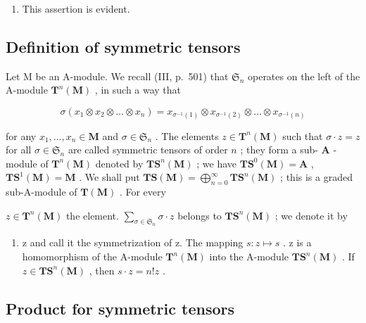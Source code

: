 \begin{enumerate}
\def\labelenumi{(\roman{enumi})}
\setcounter{enumi}{2}
\tightlist
\item
  This assertion is evident.
\end{enumerate}

\subsection{Definition of symmetric tensors}

Let M be an A-module. We recall (III, p.~501) that \(\mathfrak{S}_n\) operates on the left of the A-module \(\mathbf{T}^n (\mathbf{M})\) , in such a way that

\[
\sigma \left(x _ {1} \otimes x _ {2} \otimes \dots \otimes x _ {n}\right) = x _ {\sigma^ {- 1} (1)} \otimes x _ {\sigma^ {- 1} (2)} \otimes \dots \otimes x _ {\sigma^ {- 1} (n)}
\]

for any \(x_{1},\ldots,x_{n}\in\mathbf{M}\) and \(\sigma\in\mathfrak{S}_{n}\) . The elements \(z\in\mathbf{T}^{n}(\mathbf{M})\) such that \(\sigma\cdot z=z\) for all \(\sigma\in\mathfrak{S}_{n}\) are called symmetric tensors of order \(n\) ; they form a sub- \(\mathbf{A}\) -module of \(\mathbf{T}^{n}(\mathbf{M})\) denoted by \(\mathbf{T}\mathbf{S}^{n}(\mathbf{M})\) ; we have \(\mathbf{T}\mathbf{S}^{0}(\mathbf{M})=\mathbf{A}\) , \(\mathbf{T}\mathbf{S}^{1}(\mathbf{M})=\mathbf{M}\) . We shall put \(\mathbf{T}\mathbf{S}(\mathbf{M}) = \bigoplus_{n=0}^{\infty} \mathbf{T}\mathbf{S}^{n}(\mathbf{M})\) ; this is a graded sub-A-module of \(\mathbf{T}(\mathbf{M})\) . For every

\(z \in \mathbf{T}^n(\mathbf{M})\) the element. \(\sum_{\sigma \in \mathfrak{S}_n} \sigma \cdot z\) belongs to \(\mathbf{T}\mathbf{S}^n(\mathbf{M})\) ; we denote it by

\begin{enumerate}
\def\labelenumi{\alph{enumi}.}
\setcounter{enumi}{18}
\tightlist
\item
  z and call it the symmetrization of z. The mapping \(s: z \mapsto s\) . z is a homomorphism of the A-module \(\mathbf{T}^{n}(\mathbf{M})\) into the A-module \(\mathbf{T}\mathbf{S}^{n}(\mathbf{M})\) . If \(z \in \mathbf{T}\mathbf{S}^{n}(\mathbf{M})\) , then \(s \cdot z = n! z\) .
\end{enumerate}

\subsection{Product for symmetric tensors}

